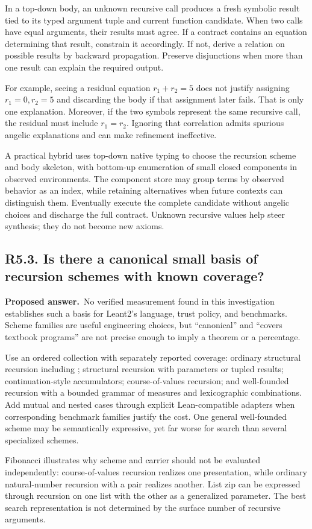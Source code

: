\documentclass[11pt,a4paper]{article}
\newcommand{\code}[1]{\texttt{\small\detokenize{#1}}}
\newcommand{\question}[2]{\subsection{#1. #2}\label{q:#1}}
\newcommand{\answer}{\textbf{Proposed answer.}\ }
\theoremstyle{remark}
\begin{document}
In a top-down body, an unknown recursive call produces a fresh symbolic
result tied to its typed argument tuple and current function candidate.
When two calls have equal arguments, their results must agree. If a contract
contains an equation determining that result, constrain it accordingly. If
not, derive a relation on possible results by backward propagation. Preserve
disjunctions when more than one result can explain the required output.

For example, seeing a residual equation $r_1+r_2=5$ does not justify assigning
$r_1=0,r_2=5$ and discarding the body if that assignment later fails. That is
only one explanation. Moreover, if the two symbols represent the same
recursive call, the residual must include $r_1=r_2$. Ignoring that correlation
admits spurious angelic explanations and can make refinement ineffective.

A practical hybrid uses top-down native typing to choose the recursion
scheme and body skeleton, with bottom-up enumeration of small closed
components in observed environments. The component store may group terms by
observed behavior as an index, while retaining alternatives when future
contexts can distinguish them. Eventually execute the complete candidate
without angelic choices and discharge the full contract. Unknown recursive
values help steer synthesis; they do not become new axioms.

\question{R5.3}{Is there a canonical small basis of recursion schemes with known coverage?}

\answer No verified measurement found in this investigation establishes such
a basis for Leant2's language, trust policy, and benchmarks. Scheme families
are useful engineering choices, but ``canonical'' and ``covers textbook
programs'' are not precise enough to imply a theorem or a percentage.

Use an ordered collection with separately reported coverage: ordinary
structural recursion including \code{Nat}; structural recursion with
parameters or tupled results; continuation-style accumulators; course-of-values
recursion; and well-founded recursion with a bounded grammar of measures and
lexicographic combinations. Add mutual and nested cases through explicit
Lean-compatible adapters when corresponding benchmark families justify the
cost. One general well-founded scheme may be semantically expressive, yet
far worse for search than several specialized schemes.

Fibonacci illustrates why scheme and carrier should not be evaluated
independently: course-of-values recursion realizes one presentation, while
ordinary natural-number recursion with a pair realizes another. List zip
can be expressed through recursion on one list with the other as a generalized
parameter. The best search representation is not determined by the surface
number of recursive arguments.
\end{document}

